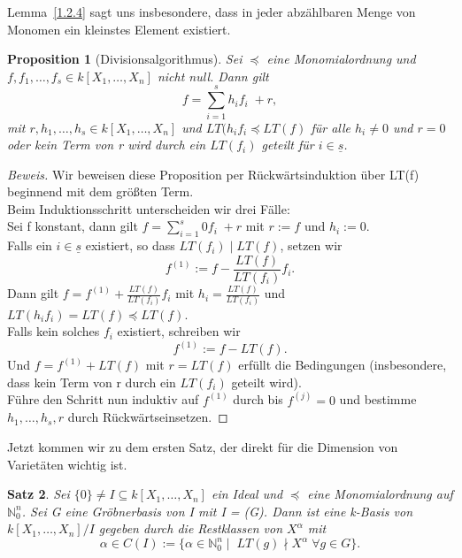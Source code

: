 \documentclass{article}
\newtheorem{satz}{Satz}
\newtheorem{proposition}[satz]{Proposition}
\newcommand*{\R}{k[X_{1},\ldots,X_{n}]}
\begin{document}
	Lemma~\ref{1.2.4} sagt uns insbesondere, dass in jeder abzählbaren Menge von Monomen ein
	kleinstes Element existiert.
	

	\begin{proposition}[Divisionsalgorithmus] \label{1.2.5}
	Sei \(\preceq\) eine Monomialordnung und \(f, f_{1}, \ldots, f_{s} \in \R\) nicht null. Dann
	gilt \begin{displaymath} f = \sum_{i=1}^{s} h_{i}f_{i}\; + r, \end{displaymath} mit
	\(r, h_{1}, \ldots, h_{s} \in \R\) und \(LT(h_{i}f_{i} \preceq LT(f)\) für alle \(h_{i} \neq 0
	\) und \(r = 0\) oder kein Term von r wird durch ein \(LT(f_{i})\) geteilt für \(i \in
	\underline{s}\).
	\end{proposition}

	\begin{proof}[Beweis]
	Wir beweisen diese Proposition per Rückwärtsinduktion über LT(f) beginnend mit dem größten Term.\\
	Beim Induktionsschritt unterscheiden wir drei Fälle:\\
	Sei f konstant, dann gilt \(f = \sum_{i=1}^{s} 0f_{i}\; + r\) mit \(r := f\) und \(h_{i} := 0\). \\
	Falls ein \(i \in \underline{s}\) existiert, so dass \(LT(f_{i})\;| \; LT(f)\), setzen wir
	\begin{displaymath} f^{(1)} := f - \frac{LT(f)}{LT(f_{i})}f_{i}.\end{displaymath} Dann gilt
	\( f = f^{(1)} + \frac{LT(f)}{LT(f_{i})}f_{i} \) mit \(h_{i} = \frac{LT(f)}{LT(f_{i})}\) und 
	\(LT(h_{i}f_{i}) = LT(f) \preceq LT(f).\) \\
	Falls kein solches \(f_{i}\) existiert, schreiben wir \begin{displaymath} f^{(1)} := f -
	LT(f). \end{displaymath} Und \(f = f^{(1)} + LT(f)\) mit \(r = LT(f)\) erfüllt die Bedingungen 
	(insbesondere, dass kein Term von r durch ein \(LT(f_{i})\) geteilt wird). \\
	Führe den Schritt nun induktiv auf \(f^{(1)}\) durch bis \(f^{(j)} = 0\) und bestimme
	\(h_{1}, \ldots, h_{s}, r\) durch Rückwärtseinsetzen.
	\end{proof}


	Jetzt kommen wir zu dem ersten Satz, der direkt für die Dimension von Varietäten wichtig ist.

	\begin{satz} \label{1.2.8}
	Sei \(\{0\} \neq I \subseteq \R\) ein Ideal und \(\preceq\) eine Monomialordnung auf
	\(\mathbb{N}^{n}_{0}\). Sei G eine Gröbnerbasis von I mit I = (G). Dann ist eine k-Basis von 
	\(\R/I\) gegeben durch die Restklassen von \(X^{\alpha}\) mit
	\begin{displaymath}
	\alpha \in C(I) := \{\alpha \in \mathbb{N}^{n}_{0}\; |\;\; LT(g) \nmid X^{\alpha}\; \forall g 
	\in G\}.
	\end{displaymath}
	\end{satz}
\end{document}
